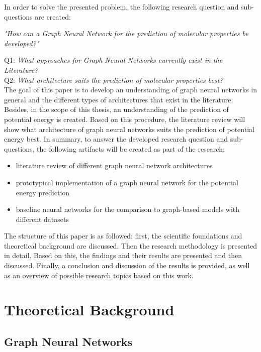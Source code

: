 In order to solve the presented problem, the following research question and sub-questions are created: 
\begin{center}
    \textit{"How can a Graph Neural Network for the prediction of molecular properties be developed?"} \\
\end{center}
Q1: \textit{What approaches for Graph Neural Networks currently exist in the Literature?} \\
Q2: \textit{What architecture suits the prediction of molecular properties best?} \\

The goal of this paper is to develop an understanding of graph neural networks in general and the different types of architectures that exist in the literature. Besides, in the scope of this thesis, an understanding of the prediction of potential energy is created. Based on this procedure, the literature review will show what architecture of graph neural networks suits the prediction of potential energy best. In summary, to answer the developed research question and sub-questions, the following artifacts will be created as part of the research: 

\begin{itemize}
    \item literature review of different graph neural network architectures
    \item prototypical implementation of a graph neural network for the potential energy 
    prediction
    \item baseline neural networks for the comparison to graph-based models with different datasets
\end{itemize}  

The structure of this paper is as followed: first, the scientific foundations and theoretical background are discussed. Then the research methodology is presented in detail. Based on this, the findings and their results are presented and then discussed. Finally, a conclusion and discussion of the results is provided, as well as an overview of possible research topics based on this work.  

\section{Theoretical Background}
\subsection{Graph Neural Networks}

